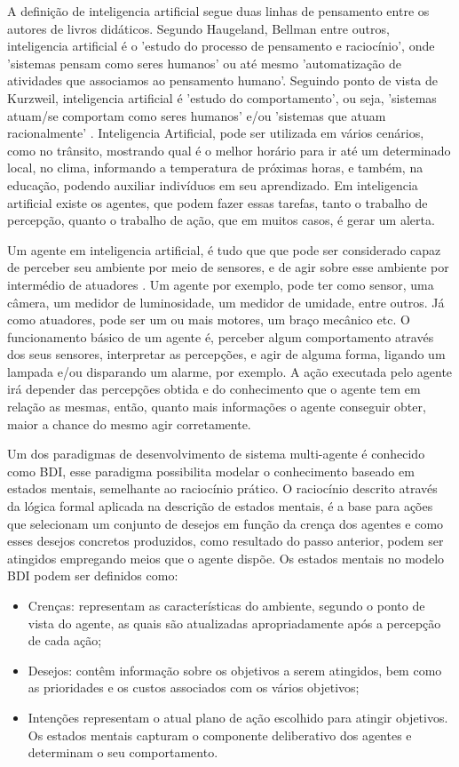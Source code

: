 \documentclass[12pt]{article}
\begin{document}
    A definição de inteligencia artificial segue duas linhas de pensamento entre os autores de livros didáticos. Segundo Haugeland, Bellman entre outros, inteligencia artificial é o 'estudo do processo de pensamento e raciocínio', onde 'sistemas pensam como seres humanos' ou até mesmo 'automatização de atividades que associamos ao pensamento humano'. Seguindo ponto de vista de Kurzweil, inteligencia artificial é 'estudo do comportamento', ou seja, 'sistemas atuam/se comportam como seres humanos' e/ou 'sistemas que atuam racionalmente' \cite{livro_IA_BU}. Inteligencia Artificial, pode ser utilizada em vários cenários, como no trânsito, mostrando qual é o melhor horário para ir até um determinado local, no clima, informando a temperatura de próximas horas, e também, na educação, podendo auxiliar indivíduos em seu aprendizado. Em inteligencia artificial existe os agentes, que podem fazer essas tarefas, tanto o trabalho de percepção, quanto o trabalho de ação, que em muitos casos, é gerar um alerta.
  
  Um agente em inteligencia artificial, é tudo que que pode ser considerado capaz de perceber seu ambiente por meio de sensores, e de agir sobre esse ambiente por intermédio de atuadores \cite{livro_IA_BU}. Um agente por exemplo, pode ter como sensor, uma câmera, um medidor de luminosidade, um medidor de umidade, entre outros. Já como atuadores, pode ser um ou mais motores, um braço mecânico etc. O funcionamento básico de um agente é, perceber algum comportamento através dos seus sensores, interpretar as percepções, e agir de alguma forma, ligando um lampada e/ou disparando um alarme, por exemplo. A ação executada pelo agente irá depender das percepções obtida e do conhecimento que o agente tem em relação as mesmas, então, quanto mais informações o agente conseguir obter, maior a chance do mesmo agir corretamente.
   
  Um dos paradigmas de desenvolvimento de sistema multi-agente é conhecido como BDI, esse paradigma possibilita modelar o conhecimento baseado em estados mentais, semelhante ao raciocínio prático. O raciocínio descrito através da lógica formal aplicada na descrição de estados mentais, é a base para ações que selecionam um conjunto de desejos em função da crença dos agentes e como esses desejos concretos produzidos, como resultado do passo anterior, podem ser atingidos empregando meios que o agente dispõe. Os estados mentais no modelo BDI podem ser definidos como: \cite{livro_IA_BU}
    \begin{itemize}
        \item Crenças: representam as características do ambiente, segundo o ponto de vista do agente, as quais são atualizadas apropriadamente após a percepção de cada ação;
        \item Desejos: contêm informação sobre os objetivos a serem atingidos, bem como as prioridades e os custos associados com os vários objetivos;
        \item Intenções representam o atual plano de ação escolhido para atingir objetivos. Os estados mentais capturam o componente deliberativo dos agentes e determinam o seu comportamento.
    \end{itemize} 
\end{document}
